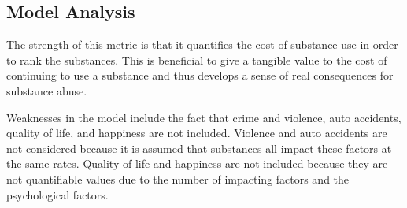 \documentclass[12pt]{article}
\begin{document}
\subsection{Model Analysis}
The strength of this metric is that it quantifies the cost of substance use in order to rank the substances. This is beneficial to give a tangible value to the cost of continuing to use a substance and thus develops a sense of real consequences for substance abuse. 

Weaknesses in the model include the fact that crime and violence, auto accidents, quality of life, and happiness are not included. Violence and auto accidents are not considered because it is assumed that substances all impact these factors at the same rates. Quality of life and happiness are not included because they are not quantifiable values due to the number of impacting factors and the psychological factors. 
\end{document}
